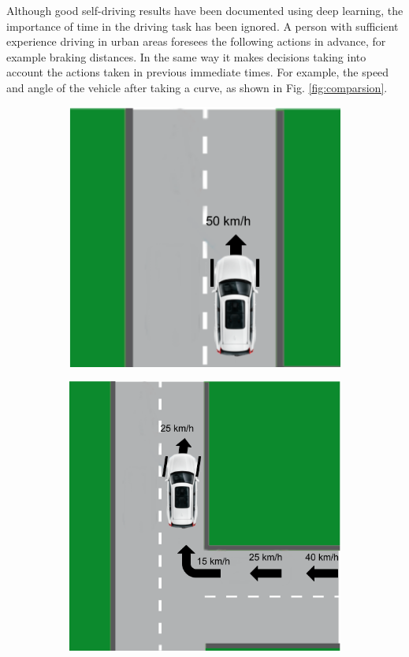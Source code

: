 \documentclass[conference]{IEEEtran}
\begin{document}
Although good self-driving results have been documented using deep learning, the importance of time in the driving task has been ignored. A person with sufficient experience driving in urban areas foresees the following actions in advance, for example braking distances. In the same way it makes decisions taking into account the actions taken in previous immediate times. For example, the speed and angle of the vehicle after taking a curve, as shown in Fig. \ref{fig:comparsion}.

\begin{figure}[h]
	\centering
	\begin{subfigure}{0.22\textwidth} 
		\includegraphics[width=\textwidth]{img/reactive}
		\label{subfig:reactive}
	\end{subfigure}
	\begin{subfigure}{0.22\textwidth} 
		\includegraphics[width=\textwidth]{img/recurrent}

\end{subfigure}
\end{figure}
\end{document}
